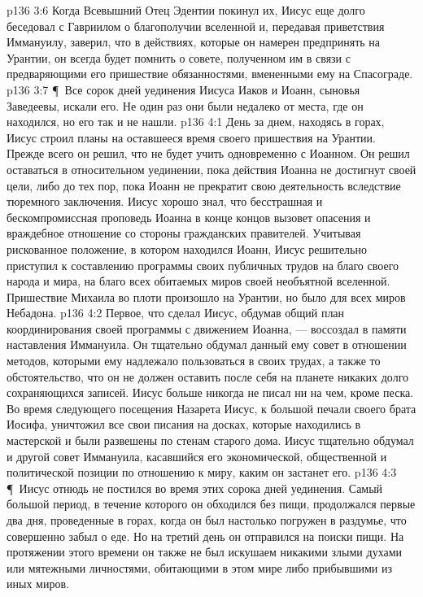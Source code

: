 \vs p136 3:6 Когда Всевышний Отец Эдентии покинул их, Иисус еще долго беседовал с Гавриилом о благополучии вселенной и, передавая приветствия Иммануилу, заверил, что в действиях, которые он намерен предпринять на Урантии, он всегда будет помнить о совете, полученном им в связи с предваряющими его пришествие обязанностями, вмененными ему на Спасограде.
\vs p136 3:7 \P\ Все сорок дней уединения Иисуса Иаков и Иоанн, сыновья Заведеевы, искали его. Не один раз они были недалеко от места, где он находился, но его так и не нашли.
\vs p136 4:1 День за днем, находясь в горах, Иисус строил планы на оставшееся время своего пришествия на Урантии. Прежде всего он решил, что не будет учить одновременно с Иоанном. Он решил оставаться в относительном уединении, пока действия Иоанна не достигнут своей цели, либо до тех пор, пока Иоанн не прекратит свою деятельность вследствие тюремного заключения. Иисус хорошо знал, что бесстрашная и бескомпромиссная проповедь Иоанна в конце концов вызовет опасения и враждебное отношение со стороны гражданских правителей. Учитывая рискованное положение, в котором находился Иоанн, Иисус решительно приступил к составлению программы своих публичных трудов на благо своего народа и мира, на благо всех обитаемых миров своей необъятной вселенной. Пришествие Михаила во плоти произошло на Урантии, но было для всех миров Небадона.
\vs p136 4:2 Первое, что сделал Иисус, обдумав общий план координирования своей программы с движением Иоанна, --- воссоздал в памяти наставления Иммануила. Он тщательно обдумал данный ему совет в отношении методов, которыми ему надлежало пользоваться в своих трудах, а также то обстоятельство, что он не должен оставить после себя на планете никаких долго сохраняющихся записей. Иисус больше никогда не писал ни на чем, кроме песка. Во время следующего посещения Назарета Иисус, к большой печали своего брата Иосифа, уничтожил все свои писания на досках, которые находились в мастерской и были развешены по стенам старого дома. Иисус тщательно обдумал и другой совет Иммануила, касавшийся его экономической, общественной и политической позиции по отношению к миру, каким он застанет его.
\vs p136 4:3 \P\ Иисус отнюдь не постился во время этих сорока дней уединения. Самый большой период, в течение которого он обходился без пищи, продолжался первые два дня, проведенные в горах, когда он был настолько погружен в раздумье, что совершенно забыл о еде. Но на третий день он отправился на поиски пищи. На протяжении этого времени он также не был искушаем никакими злыми духами или мятежными личностями, обитающими в этом мире либо прибывшими из иных миров.

